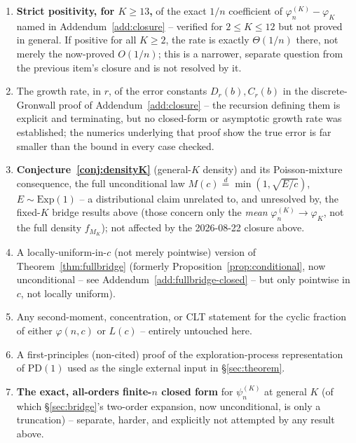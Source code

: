 \documentclass[11pt]{article}
\theoremstyle{remark}
\newcommand{\Exp}{\mathrm{Exp}}
\newcommand{\PD}{\mathrm{PD}}
\begin{document}
\begin{enumerate}
  $\Theta(1/n^2)$ to $\Theta(1/n)$ remains a standing caution against
  assuming any rate extrapolates without a proof or a verified closed
  form. \textbf{[Closed, 2026-08-22 -- see Addendum~\ref{add:closure}.]}
  Theorem~\ref{thm:rate}'s leading coefficient $K\varphi_K/4$ is now
  proved unconditionally for every $K$, not just through $K=10$; and the
  \emph{exact} $1/n$ coefficient of $\varphi_n^{(K)}-\varphi_K$ (not
  merely $\psi_n^{(K)}-\varphi_K$) is now known unconditionally for
  every $K\ge1$ (Addendum~\ref{add:closure}), reproducing the $K=1$
  cancellation above as an exact-zero special case rather than a
  separate observation.
\item \textbf{Strict positivity, for $K\ge13$,} of the exact $1/n$
  coefficient of $\varphi_n^{(K)}-\varphi_K$ named in
  Addendum~\ref{add:closure} -- verified for $2\le K\le12$ but not
  proved in general. If positive for all $K\ge2$, the rate is exactly
  $\Theta(1/n)$ there, not merely the now-proved $O(1/n)$; this is a
  narrower, separate question from the previous item's closure and is
  not resolved by it.
\item The growth rate, in $r$, of the error constants $D_r(b), C_r(b)$
  in the discrete-Gronwall proof of Addendum~\ref{add:closure} -- the
  recursion defining them is explicit and terminating, but no
  closed-form or asymptotic growth rate was established; the numerics
  underlying that proof show the true error is far smaller than the
  bound in every case checked.
\item \textbf{Conjecture~\ref{conj:densityK}} (general-$K$ density) and
  its Poisson-mixture consequence, the full unconditional law
  $M(c)\stackrel{d}{=}\min(1,\sqrt{E/c})$, $E\sim\Exp(1)$ -- a
  distributional claim unrelated to, and unresolved by, the fixed-$K$
  bridge results above (those concern only the \emph{mean}
  $\varphi_n^{(K)}\to\varphi_K$, not the full density $f_{M_K}$); not
  affected by the 2026-08-22 closure above.
\item A locally-uniform-in-$c$ (not merely pointwise) version of
  Theorem~\ref{thm:fullbridge} (formerly Proposition~\ref{prop:conditional},
  now unconditional -- see Addendum~\ref{add:fullbridge-closed} -- but
  only pointwise in $c$, not locally uniform).
\item Any second-moment, concentration, or CLT statement for the cyclic
  fraction of either $\varphi(n,c)$ or $L(c)$ -- entirely untouched here.
\item A first-principles (non-cited) proof of the exploration-process
  representation of $\PD(1)$ used as the single external input in
  \S\ref{sec:theorem}.
\item \textbf{The exact, all-orders finite-$n$ closed form} for
  $\psi_n^{(K)}$ at general $K$ (of which \S\ref{sec:bridge}'s two-order
  expansion, now unconditional, is only a truncation) -- separate,
  harder, and explicitly not attempted by any result above.
\end{enumerate}



\end{document}
